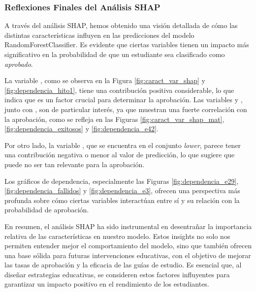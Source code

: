 \subsubsection{Reflexiones Finales del Análisis SHAP}

A través del análisis SHAP, hemos obtenido una visión detallada de cómo las distintas características influyen en las predicciones del modelo RandomForestClassifier. Es evidente que ciertas variables tienen un impacto más significativo en la probabilidad de que un estudiante sea clasificado como \textit{aprobado}.

La variable , como se observa en la Figura \ref{fig:caract_var_shap} y \ref{fig:dependencia_hito1}, tiene una contribución positiva considerable, lo que indica que es un factor crucial para determinar la aprobación. Las variables  y , junto con , son de particular interés, ya que muestran una fuerte correlación con la aprobación, como se refleja en las Figuras \ref{fig:caract_var_shap_mat}, \ref{fig:dependencia_exitosos} y \ref{fig:dependencia_e42}.

Por otro lado, la variable , que se encuentra en el conjunto \textit{lower}, parece tener una contribución negativa o menor al valor de predicción, lo que sugiere que puede no ser tan relevante para la aprobación.

Los gráficos de dependencia, especialmente las Figuras \ref{fig:dependencia_e29}, \ref{fig:dependencia_fallidos} y \ref{fig:dependencia_e3}, ofrecen una perspectiva más profunda sobre cómo ciertas variables interactúan entre sí y su relación con la probabilidad de aprobación.

En resumen, el análisis SHAP ha sido instrumental en desentrañar la importancia relativa de las características en nuestro modelo. Estos insights no solo nos permiten entender mejor el comportamiento del modelo, sino que también ofrecen una base sólida para futuras intervenciones educativas, con el objetivo de mejorar las tasas de aprobación y la eficacia de las guías de estudio. Es esencial que, al diseñar estrategias educativas, se consideren estos factores influyentes para garantizar un impacto positivo en el rendimiento de los estudiantes.
